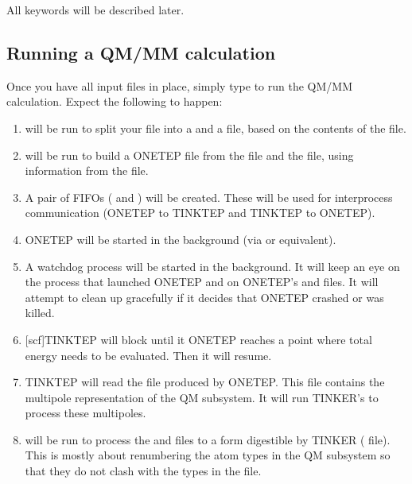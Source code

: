 \documentclass[letterpaper,10pt,english]{sphinxmanual}
\begin{document}
All  keywords will be described later.


\subsection{Running a QM/MM calculation}
\label{\detokenize{tinktep:running-a-qm-mm-calculation}}
Once you have all input files in place, simply type  to run
the QM/MM calculation. Expect the following to happen:
\begin{enumerate}
\item {} 
 will be run to split your  file into a
 and a  file, based on the contents of the
 file.

\item {} 
 will be run to build a ONETEP  file from
the  file and the  file, using information
from the  file.

\item {} 
A pair of FIFOs ( and ) will be
created. These will be used for interprocess communication (ONETEP to
TINKTEP and TINKTEP to ONETEP).

\item {} 
ONETEP will be started in the background (via  or
equivalent).

\item {} 
A watchdog process will be started in the background. It will keep an
eye on the  process that launched ONETEP and on ONETEP’s
 and  files. It will attempt to clean up
gracefully if it decides that ONETEP crashed or was killed.

\item {} 
{[}scf{]}TINKTEP will block until it ONETEP reaches a point where total
energy needs to be evaluated. Then it will resume.

\item {} 
TINKTEP will read the  file produced by ONETEP.
This file contains the multipole representation of the QM subsystem.
It will run TINKER’s  to process these multipoles.

\item {} 
 will be run to process the  and 
files to a form digestible by TINKER ( file). This is
mostly about renumbering the atom types in the QM subsystem so that
they do not clash with the types in the  file.


\end{enumerate}
\end{document}
